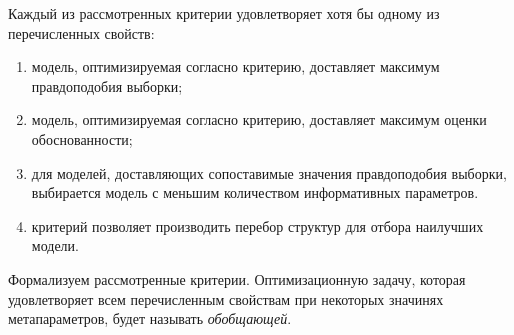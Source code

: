 Каждый из рассмотренных критерии удовлетворяет хотя бы одному из перечисленных свойств:
\begin{enumerate}[label={\arabic*)}]
\item модель, оптимизируемая согласно критерию, доставляет максимум правдоподобия выборки;
\item модель, оптимизируемая согласно критерию, доставляет максимум оценки обоснованности;
\item для моделей, доставляющих сопоставимые значения правдоподобия выборки, выбирается модель с меньшим количеством информативных параметров.
\item критерий позволяет производить перебор структур для отбора наилучших модели.
\end{enumerate}

Формализуем рассмотренные критерии. Оптимизационную задачу, которая удовлетворяет всем перечисленным свойствам при некоторых значинях метапараметров, будет называть \textit{обобщающей}.


